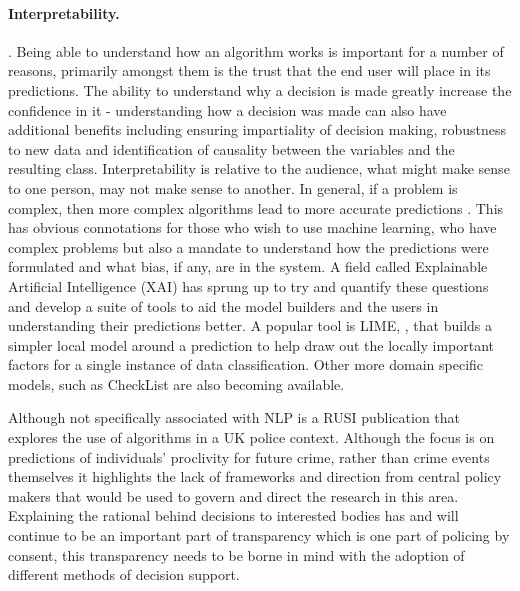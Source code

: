 \paragraph{Interpretability.}   \parencite{arrieta2020explainable}. Being able to understand how an algorithm works is important for a number of reasons, primarily amongst them is the trust that the end user will place in its predictions. The ability to understand why a decision is made greatly increase the confidence in it - understanding how a decision was made can also have additional benefits including ensuring impartiality of decision making, robustness to new data and identification of causality between the variables and the resulting class. Interpretability is relative to the audience, what might make sense to one person, may not make sense to another. In general, if a problem is complex, then more complex algorithms lead to more accurate predictions \parencite{arrieta2020explainable}. This has obvious connotations for those who wish to use machine learning, who have complex problems but also a mandate to understand how the predictions were formulated and what bias, if any, are in the system. A field called Explainable Artificial Intelligence (XAI) has sprung up to try and quantify these questions and develop a suite of tools to aid the model builders and the users in understanding their predictions better. A popular tool is LIME, \parencite{ribeiro2016should}, that builds a simpler local model around a prediction to help draw out the locally important factors for a single instance of data classification. Other more domain specific models, such as CheckList  \parencite{ribeiro2020beyond} are also becoming available. 

Although not specifically associated with NLP  \textcite{babuta2018machine} is a RUSI publication that explores the use of algorithms in a UK police context. Although the focus is on predictions of individuals' proclivity for future crime, rather than crime events themselves it highlights the lack of frameworks and direction from central policy makers that would be used to govern and direct the research in this area. Explaining the rational behind decisions to interested bodies has and will continue to be an important part of transparency which is one part of policing by consent, this transparency needs to be borne in mind with the adoption of different methods of decision support. 

